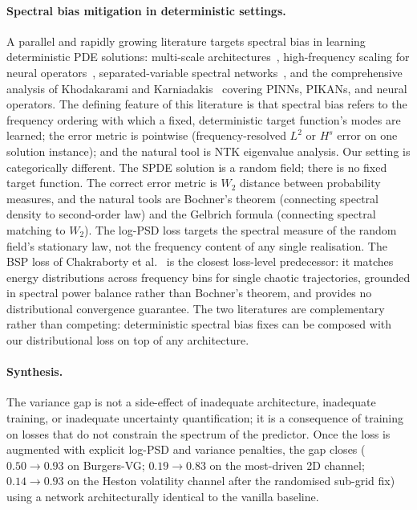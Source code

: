\documentclass[review,12pt]{elsarticle}
\begin{document}
\paragraph{Spectral bias mitigation in deterministic settings.}
A parallel and rapidly growing literature targets spectral bias in
learning deterministic PDE solutions: multi-scale
architectures~\cite{WangMscaleDNN2023,WangMscaleDeepONet2025},
high-frequency scaling for neural
operators~\cite{KhodakaramiHFS2025}, separated-variable spectral
networks~\cite{XiongSVSNN2025}, and the comprehensive analysis of
Khodakarami and Karniadakis~\cite{KhodakaramiKarniadakis2026}
covering PINNs, PIKANs, and neural operators.
The defining feature of this literature is that spectral bias refers
to the frequency ordering with which a fixed, deterministic target
function's modes are learned; the error metric is pointwise
(frequency-resolved \(L^2\) or \(H^s\) error on one solution
instance); and the natural tool is NTK eigenvalue analysis.
Our setting is categorically different.
The SPDE solution is a random field; there is no fixed target
function.
The correct error metric is \(W_2\) distance between probability
measures, and the natural tools are Bochner's theorem (connecting
spectral density to second-order law) and the Gelbrich formula
(connecting spectral matching to \(W_2\)).
The log-PSD loss targets the spectral measure of the random field's
stationary law, not the frequency content of any single realisation.
The BSP loss of Chakraborty et al.~\cite{Chakraborty2025BSP} is the
closest loss-level predecessor: it matches energy distributions across
frequency bins for single chaotic trajectories, grounded in spectral
power balance rather than Bochner's theorem, and provides no
distributional convergence guarantee.
The two literatures are complementary rather than competing:
deterministic spectral bias fixes can be composed with our
distributional loss on top of any architecture.

\paragraph{Synthesis.}
The variance gap is not a side-effect of inadequate architecture,
inadequate training, or inadequate uncertainty quantification;
it is a consequence of training on losses that do not constrain
the spectrum of the predictor. Once the loss is augmented with
explicit log-PSD and variance penalties, the gap closes
(\(0.50\to 0.93\) on Burgers-VG; \(0.19 \to 0.83\) on the
most-driven 2D channel; \(0.14 \to 0.93\) on the Heston volatility
channel after the randomised sub-grid fix) using a network
architecturally identical to the vanilla baseline.
\end{document}
